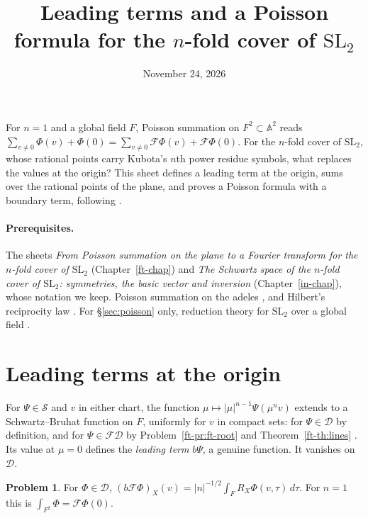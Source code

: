 \documentclass[reqno]{amsart}
\title[A Poisson formula for the $n$-fold cover]{Leading terms and a Poisson
  formula for the $n$-fold cover of $\mathrm{SL}_2$}
\author{}
\date{November 24, 2026}
\newcommand{\SL}{\mathrm{SL}_2}
\newcommand{\Fc}{\mathcal{F}}
\newcommand{\Dc}{\mathcal{D}}
\newcommand{\Sc}{\mathcal{S}}
\newcommand{\Ab}{\mathbb{A}}
\newcounter{chap}
\numberwithin{equation}{section}
\theoremstyle{definition}
\newtheorem{problem}{Problem}[section]
\theoremstyle{plain}
\begin{document}
\maketitle
{}\label{chap}

For $n = 1$ and a global field $F$, Poisson summation on $F^2 \subset \Ab^2$ reads $\sum_{v \neq 0} \Phi(v) + \Phi(0) = \sum_{v \neq 0} \Fc \Phi(v) + \Fc \Phi(0)$.  For the $n$-fold cover of $\SL$, whose rational points carry Kubota's $n$th power residue symbols, what replaces the values at the origin?  This sheet defines a leading term at the origin, sums over the rational points of the plane, and proves a Poisson formula with a boundary term, following \cite{N}.

\paragraph{Prerequisites.}
The sheets \emph{From Poisson summation on the plane to a Fourier transform for the $n$-fold cover of $\mathrm{SL}_2$} (Chapter~\ref{ft-chap}) and \emph{The Schwartz space of the $n$-fold cover of $\mathrm{SL}_2$: symmetries, the basic vector and inversion} (Chapter~\ref{in-chap}), whose notation we keep.  Poisson summation on the adeles \cite[\S4.2]{Tate}, and Hilbert's reciprocity law \cite[Ch.~VI, Theorem~8.1]{Neu}.  For \S\ref{sec:poisson} only, reduction theory for $\SL$ over a global field \cite[I.2.1]{MW}.


\section{Leading terms at the origin}\label{sec:germs}

For $\Psi \in \Sc$ and $v$ in either chart, the function $\mu \mapsto \lvert \mu \rvert^{n-1} \Psi(\mu^n v)$ extends to a Schwartz--Bruhat function on $F$, uniformly for $v$ in compact sets: for $\Psi \in \Dc$ by definition, and for $\Psi \in \Fc \Dc$ by Problem~\ref{ft-pr:ft-root} and Theorem~\ref{ft-th:lines} \cite[Proposition~8.1]{N}.  Its value at $\mu = 0$ defines the \emph{leading term} $b \Psi$, a genuine function.  It vanishes on $\Dc$.

\begin{problem}\label{pr:leading-transform}
  For $\Phi \in \Dc$, $(b \Fc \Phi)_X(v) = \lvert n \rvert^{-1/2} \int_F R_X \Phi(v, \tau) \, d \tau$.  For $n = 1$ this is $\int_{F^2} \Phi = \Fc \Phi(0)$.
\end{problem}
\end{document}

